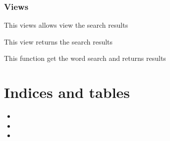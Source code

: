 \documentclass[letterpaper,10pt,english]{sphinxmanual}
\begin{document}
\subsection{Views}
\label{modules/search:views}
This views allows view the search results
\label{modules/search:module-apps.search.views}

\begin{fulllineitems}
\label{modules/search:apps.search.views.Search}
This view returns the search results

\begin{fulllineitems}
\label{modules/search:apps.search.views.Search.get}
This function get the word search and returns results

\end{fulllineitems}


\end{fulllineitems}



\chapter{Indices and tables}
\label{index:indices-and-tables}\begin{itemize}
\item {} 

\item {} 

\item {} 

\end{itemize}
\end{document}
